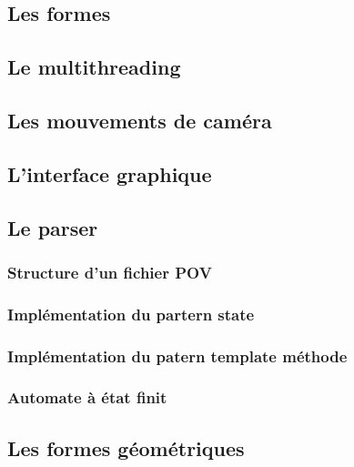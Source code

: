 \documentclass[11pt]{article}
\begin{document}
    \subsection{Les formes}
	

    \subsection{Le multithreading}

        

    \subsection{Les mouvements de caméra}
        \label{mouvementsCamera}

        

    \subsection{L'interface graphique}

    

    \subsection{Le parser}
        \subsubsection{Structure d'un fichier POV}
        \subsubsection{Implémentation du partern state}
        \subsubsection{Implémentation du patern template méthode}
        \subsubsection{Automate à état finit}


    \subsection{Les formes géométriques}
\end{document}
